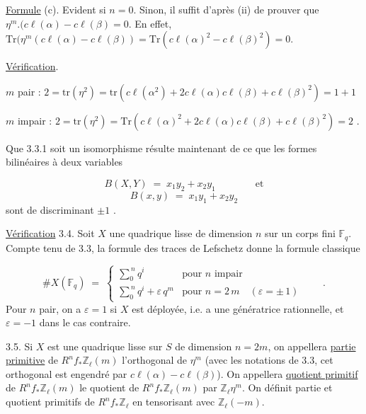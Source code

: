 \underline{Formule} (c). Evident si $n = 0$. Sinon, il suffit d'après (ii) de prouver que $\eta^{m}.(c\ell(\alpha)-c\ell(\beta) = 0$. En effet, $\mathrm{Tr}(\eta^{m}(c\ell(\alpha)-c\ell(\beta)) = \mathrm{Tr}(c\ell(\alpha)^{2}-c\ell(\beta)^{2})=0$.

\underline{Vérification}.

$m$ pair : $2 = \mathrm{tr}(\eta^{2}) = \mathrm{tr}(c\ell(\alpha^{2})+ 2c\ell(\alpha)c\ell(\beta) + c\ell(\beta)^{2}) = 1 + 1$

$m$ impair : $2 = \mathrm{tr}(\eta^{2}) = \mathrm{Tr}(c\ell(\alpha)^{2} + 2c\ell(\alpha)c\ell(\beta) + c\ell(\beta)^{2}) = 2$ .

Que 3.3.1 soit un isomorphisme résulte maintenant de ce que les formes bilinéaires à deux variables

\begin{equation*}
B(X,Y) \; = \; x_{1}y_{2} + x_{2}y_{1} \qquad\qquad \mathrm{et}
\end{equation*}
\begin{equation*}
B(x,y) \; = \; x_{1}y_{1} + x_{2}y_{2}
\end{equation*}
sont de discriminant $\pm 1$ .



\underline{Vérification} 3.4. Soit $X$ une quadrique lisse de dimension $n$ sur un corps fini $\mathbb{F}_q$. Compte tenu de 3.3, la formule des traces de Lefschetz donne la formule classique

\begin{equation*}
\# X(\mathbb{F}_q) \;=\; \left\{ \begin{array}{ll} \displaystyle\sum_{0}^{\,n} q^{i} & \mbox{pour } n \mbox{ impair} \\[3ex] \displaystyle\sum_{0}^{\,n} q^{i} + \varepsilon\, q^{m} & \mbox{pour } n = 2\,m \quad (\varepsilon = \pm\, 1) \end{array} \right. \qquad .
\end{equation*}
Pour $n$ pair, on a $\varepsilon = 1$ si $X$ est déployée, i.e. \quad a une génératrice rationnelle, et $\varepsilon = -1$ dans le cas contraire.

3.5. Si $X$ est une quadrique lisse sur $S$ de dimension $n = 2m$, on appellera \underline{partie primitive} de $R^{n}f_{*}\mathbb{Z}_{\ell}(m)$ l'orthogonal de $\eta^{m}$ (avec les notations de 3.3, cet orthogonal est engendré par $c\ell(\alpha)-c\ell(\beta)$). On appellera \underline{quotient primitif} de $R^{n}f_{*}\mathbb{Z}_{\ell}(m)$ le quotient de $R^{n}f_{*}\mathbb{Z}_{\ell}(m)$ par $\mathbb{Z}_{\ell}\eta^{m}$. On définit partie et quotient primitifs de $R^{n}f_{*}\mathbb{Z}_{\ell}$ en tensorisant avec $\mathbb{Z}_{\ell}(-m)$.

